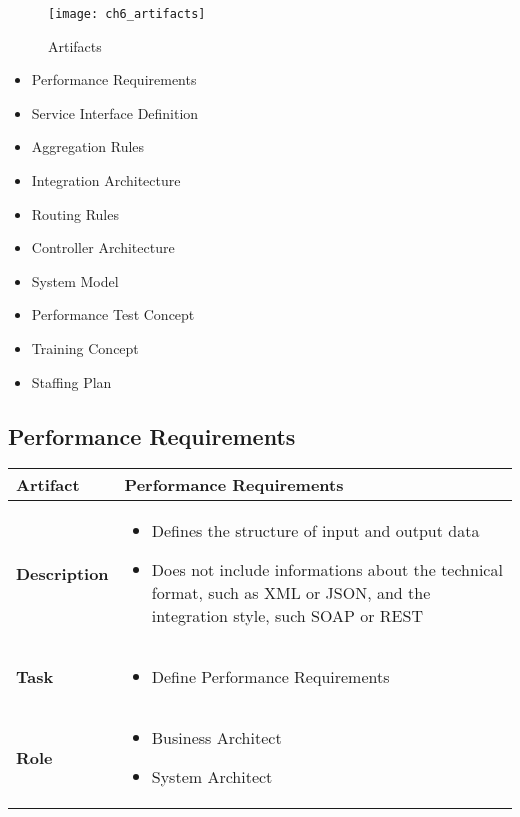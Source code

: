 \begin{figure}[htpb] \centering 
	\texttt{[image: ch6\_artifacts]} 
	\caption{Artifacts} 
	\label{fig:ch6_artifacts} 
\end{figure}

\begin{itemize}
	\item Performance Requirements
	\item Service Interface Definition
	\item Aggregation Rules
	\item Integration Architecture
	\item Routing Rules
	\item Controller Architecture
	\item System Model
	\item Performance Test Concept
	\item Training Concept
	\item Staffing Plan
\end{itemize}

\subsection{Performance Requirements}
\begin{tabularx}{\textwidth}{@{} l X @{}}
	\caption{Performance Requirements} \label{table:ch6_Artifact_Performance_Requirements}\\
	\toprule 
	\bfseries Artifact & Performance Requirements\\
	\midrule 
	\bfseries Description & 
	\begin{itemize}
		\item Defines the structure of input and output data
		\item Does not include informations about the technical format, such as \ac{XML} or \ac{JSON}, and the integration style, such SOAP or \ac{REST}
	\end{itemize}
	\\
	\midrule 
	\bfseries Task & 
	\begin{itemize}
		\item Define Performance Requirements
	\end{itemize}
	\\
	\midrule 
	\bfseries Role & 
	\begin{itemize}
		\item Business Architect
		\item System Architect
	\end{itemize}\\
	\bottomrule 
\end{tabularx}


